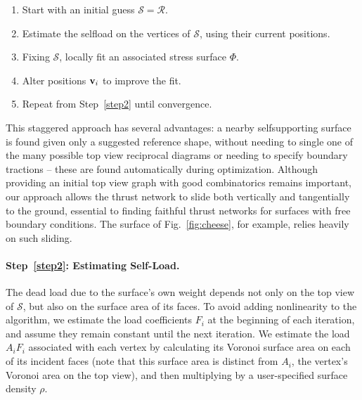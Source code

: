 \documentclass[review]{acmsiggraph}
\def\SS{{\mathcal S}}
\def\RR{{\mathcal R}}
\begin{document}
\begin{enumerate}\itemsep-\parsep\setcounter{enumi}{-1}

\item Start with an initial guess $\SS = \RR$.

\item \label{step2} Estimate the self\dash load on the vertices of $\SS$, 
using their current positions.

\item \label{step3} Fixing $\SS$, locally fit an associated stress surface $\Phi$.

\item \label{step4} Alter positions ${\mathbf v}_i$ to improve the fit.

\item Repeat from Step~\ref{step2} until convergence.

\end{enumerate}

This staggered approach has several advantages: a nearby self\dash supporting surface
is found given only a suggested reference shape, without needing to single one of
the many possible top view reciprocal diagrams or needing to specify boundary
tractions -- these are found automatically during optimization. Although providing
an initial top view graph with good combinatorics remains important, our approach
allows the thrust network to slide both vertically and tangentially to the ground,
essential to finding faithful thrust networks for surfaces with free boundary conditions.
The surface of Fig.~\ref{fig:cheese}, for example, relies heavily on such sliding.

\paragraph{Step~\ref{step2}: Estimating Self-Load.}

The dead load due to the surface's own weight depends not only on the top 
view of $\SS$, but also on the surface area of its faces. To avoid adding 
nonlinearity to the algorithm, we estimate the load coefficients $F_i$ at 
the beginning of each iteration, and assume they remain constant until the 
next iteration. We estimate the load $A_iF_i$ associated with each 
vertex by calculating its Voronoi surface area on each of its incident faces 
(note that this surface area is distinct from $A_i$, the vertex's Voronoi 
area on the top view), and then multiplying by a user-specified surface density $\rho$.
\end{document}
